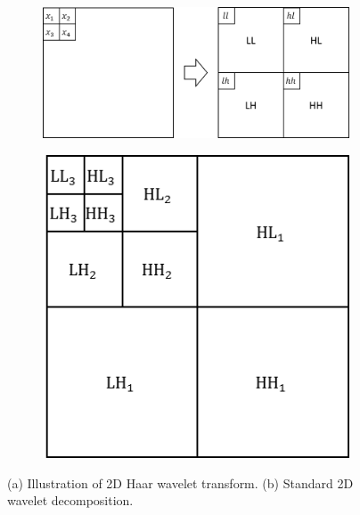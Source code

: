 \documentclass[11pt]{article}
\begin{document}
\begin{figure}[H]
	\centering
	\begin{subfigure}{0.55\textwidth}
	  	\centering
		\includegraphics[width=\textwidth]{Fig_HaarWavelet.png}        
		\caption{}
	    \label{Fig_HaarWavelet}	
    \end{subfigure}
	\hspace{0.5in}
	\begin{subfigure}{0.25\textwidth}
        \centering
		\includegraphics[width=\textwidth]{Fig_HaarWaveletPattern.png}
		\caption{}
		\label{Fig_HaarWaveletPattern}
	\end{subfigure}
	\caption{(a) Illustration of 2D Haar wavelet transform. (b) Standard 2D wavelet decomposition.}
	\label{Fig_HaarWavelet_and_Pattern}
\end{figure}
\end{document}
